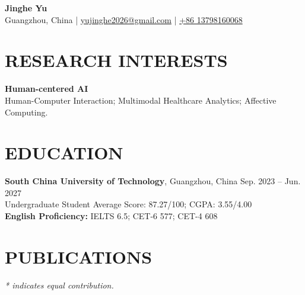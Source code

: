\documentclass[a4paper,10pt]{extarticle}
\newcommand{\cvitem}[2]{\textbf{#1:} #2}
\begin{document}
\pagestyle{fancy}
\renewcommand{\headrulewidth}{0pt}
\fancyhead{}
\thispagestyle{empty}

\begin{center}
    {\LARGE \textbf{Jinghe Yu}}\\[4pt]
    Guangzhou, China \quad | \quad
    \href{mailto:yujinghe2026@gmail.com}{yujinghe2026@gmail.com} \quad | \quad
    \href{tel:+8613798160068}{+86 13798160068}
\end{center}

\section*{RESEARCH INTERESTS}
 \textbf{Human-centered AI}\\
 Human-Computer Interaction; Multimodal Healthcare Analytics; Affective Computing.

\section*{EDUCATION}
\textbf{South China University of Technology}, Guangzhou, China \hfill Sep. 2023 -- Jun. 2027\\
Undergraduate Student \hfill Average Score: 87.27/100; CGPA: 3.55/4.00\\
\cvitem{English Proficiency}{IELTS 6.5; CET-6 577; CET-4 608}

\section*{PUBLICATIONS}
\textit{* indicates equal contribution.}
\end{document}
